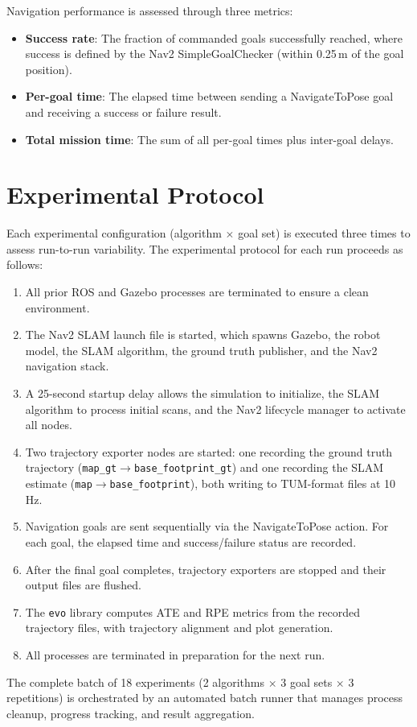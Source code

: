 Navigation performance is assessed through three metrics:
\begin{itemize}
\item \textbf{Success rate}: The fraction of commanded goals successfully reached, where success is defined by the Nav2 SimpleGoalChecker (within 0.25\,m of the goal position).
\item \textbf{Per-goal time}: The elapsed time between sending a NavigateToPose goal and receiving a success or failure result.
\item \textbf{Total mission time}: The sum of all per-goal times plus inter-goal delays.
\end{itemize}

\section{Experimental Protocol}

Each experimental configuration (algorithm $\times$ goal set) is executed three times to assess run-to-run variability. The experimental protocol for each run proceeds as follows:

\begin{enumerate}
\item All prior ROS and Gazebo processes are terminated to ensure a clean environment.
\item The Nav2 SLAM launch file is started, which spawns Gazebo, the robot model, the SLAM algorithm, the ground truth publisher, and the Nav2 navigation stack.
\item A 25-second startup delay allows the simulation to initialize, the SLAM algorithm to process initial scans, and the Nav2 lifecycle manager to activate all nodes.
\item Two trajectory exporter nodes are started: one recording the ground truth trajectory (\texttt{map\_gt}$\rightarrow$\texttt{base\_footprint\_gt}) and one recording the SLAM estimate (\texttt{map}$\rightarrow$\texttt{base\_footprint}), both writing to TUM-format files at 10\,Hz.
\item Navigation goals are sent sequentially via the NavigateToPose action. For each goal, the elapsed time and success/failure status are recorded.
\item After the final goal completes, trajectory exporters are stopped and their output files are flushed.
\item The \texttt{evo} library computes ATE and RPE metrics from the recorded trajectory files, with trajectory alignment and plot generation.
\item All processes are terminated in preparation for the next run.
\end{enumerate}

The complete batch of 18 experiments (2 algorithms $\times$ 3 goal sets $\times$ 3 repetitions) is orchestrated by an automated batch runner that manages process cleanup, progress tracking, and result aggregation.
